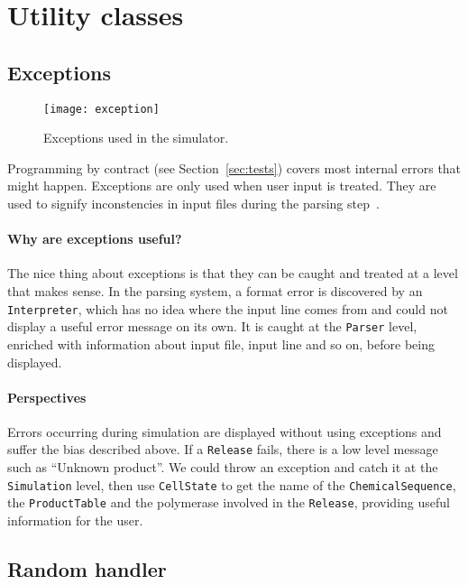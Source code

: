 
\section{Utility classes}

\subsection{Exceptions}

\begin{figure}[!h]
  \centering
  \texttt{[image: exception]}
  \caption{Exceptions used in the simulator.}
  \label{fig:exception}
\end{figure}

Programming by contract (see Section~\ref{sec:tests}) covers most internal errors that might happen. Exceptions are only used when user input is treated. They are used to signify inconstencies in input files during the parsing step~.

\paragraph{Why are exceptions useful?} The nice thing about exceptions is that they can be caught and treated at a level that makes sense. In the parsing system, a format error is discovered by an \texttt{Interpreter}, which has no idea where the input line comes from and could not display a useful error message on its own. It is caught at the \texttt{Parser} level, enriched with information about input file, input line and so on, before being displayed.

\paragraph{Perspectives} Errors occurring during simulation are displayed without using exceptions and suffer the bias described above. If a \texttt{Release} fails, there is a low level message such as ``Unknown product''. We could throw an exception and catch it at the \texttt{Simulation} level, then use \texttt{CellState} to get the name of the \texttt{ChemicalSequence}, the \texttt{ProductTable} and the polymerase involved in the \texttt{Release}, providing useful information for the user.

\subsection{Random handler}

